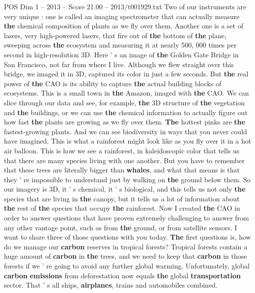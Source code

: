 \begin{textsample}{POS Dim 1 – 2013 – Score 21.00 – 2013/t001929.txt}
Two of our instruments are very unique : one is called an imaging spectrometer that can actually measure \textbf{the} chemical composition of plants as we fly over them.
Another one is a set of lasers, very high-powered lasers, that fire out of \textbf{the} bottom of \textbf{the} plane, sweeping across \textbf{the} ecosystem and measuring it at nearly 500, 000 times per second in high-resolution 3D.
Here ' s an image of \textbf{the} Golden Gate Bridge in San Francisco, not far from where I live.
Although we flew straight over this bridge, we imaged it in 3D, captured its color in just a few seconds.
But \textbf{the} real power of \textbf{the} CAO is its ability to capture \textbf{the} actual building blocks of ecosystems.
This is a small town in \textbf{the} Amazon, imaged with \textbf{the} CAO.
We can slice through our data and see, for example, \textbf{the} 3D structure of \textbf{the} vegetation and \textbf{the} buildings, or we can use \textbf{the} chemical information to actually figure out how fast \textbf{the} plants are growing as we fly over them. \textbf{The} hottest pinks are \textbf{the} fastest-growing plants.
And we can see biodiversity in ways that you never could have imagined.
This is what a rainforest might look like as you fly over it in a hot air balloon.
This is how we see a rainforest, in kaleidoscopic color that tells us that there are many species living with one another.
But you have to remember that these trees are literally bigger than \textbf{whales}, and what that means is that they ' re impossible to understand just by walking on \textbf{the} ground below them.
So our imagery is 3D, it ' s chemical, it ' s biological, and this tells us not only \textbf{the} species that are living in \textbf{the} canopy, but it tells us a lot of information about \textbf{the} rest of \textbf{the} species that occupy \textbf{the} rainforest.
Now I created \textbf{the} CAO in order to answer questions that have proven extremely challenging to answer from any other vantage point, such as from \textbf{the} ground, or from satellite sensors.
I want to share three of those questions with you today. \textbf{The} first questions is, how do we manage our \textbf{carbon} reserves in tropical forests?
Tropical forests contain a huge amount of \textbf{carbon} in \textbf{the} trees, and we need to keep that \textbf{carbon} in those forests if we ' re going to avoid any further global warming.
Unfortunately, global \textbf{carbon} \textbf{emissions} from deforestation now equals \textbf{the} global \textbf{transportation} sector.
That ' s all ships, \textbf{airplanes}, trains and automobiles combined.

\end{textsample}
